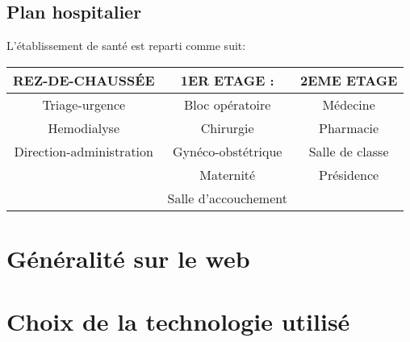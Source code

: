 		
		\subsection{Plan hospitalier}
		L'établissement de santé est reparti comme suit:
	
		\medskip
		\begin{tabular}{|c|c|c|}
		\hline  REZ-DE-CHAUSSÉE & 1ER ETAGE : & 2EME ETAGE \\ 
		\hline Triage-urgence & Bloc opératoire & Médecine \\ 
		 Hemodialyse & Chirurgie  & Pharmacie \\ 
		 Direction-administration & Gynéco-obstétrique & Salle de classe \\ 
		  & Maternité & Présidence \\ 
		  & Salle d'accouchement &  \\ 
		\hline 
		\end{tabular} 
		\medskip
		
		\section{Généralité sur le web}
		
		\section{Choix de la technologie utilisé}
		
